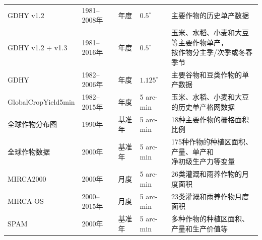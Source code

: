 \begin{longtable}{@{}m{}%
    m{}m{}m{}m{}@{}}
GDHY v1.2 \cite{Iizumi2019GDHYData}
& %
1981--2008年
& 年度
& $0.5^\circ$
& 主要作物的历史单产数据 \\

GDHY v1.2 + v1.3\cite{Iizumi2020GDHY}
& %
1981--2016年
& 年度
& $0.5^\circ$
& \makecell[l]{玉米、水稻、小麦和大豆等主要作物单产，\\[-3pt]按作物分主季/次季或冬春季节} \\

GDHY\cite{Iizumi2014GDHY}
& %
1982--2006年
& 年度
& $1.125^\circ$
& 主要谷物和豆类作物的单产数据 \\

GlobalCropYield5min\cite{Cao2025GlobalCropYield5min}
& %
1982--2015年
& 年度
& 5 arc-min
& 玉米、水稻、小麦和大豆的历史单产格网数据\\

全球作物分布图\cite{Leff2004}
& %
1990年
& 基准年
& 5 arc-min
& 18种主要作物的栅格面积比例\\

全球作物数据\cite{Monfreda2008CropDistribution}
& %
2000年
& 基准年
& 5 arc-min
& \makecell[l]{175种作物的种植区面积、产量、单产和\\[-3pt] 净初级生产力等变量} \\

MIRCA2000\cite{Portmann2010MIRCA}
& %
2000年
& 月度
& 5 arc-min
& 26类灌溉和雨养作物的月度面积 \\

MIRCA-OS\cite{Kebede2025MIRCAOS}
& %
2000--2015年
& 月度
& 5 arc-min
& 23类灌溉和雨养作物月度面积 \\

SPAM\cite{You2014SPAM}
& %
2000年
& 基准年
& 5 arc-min
& 多种作物的种植区面积、产量和生产价值等
\\



\end{longtable}
